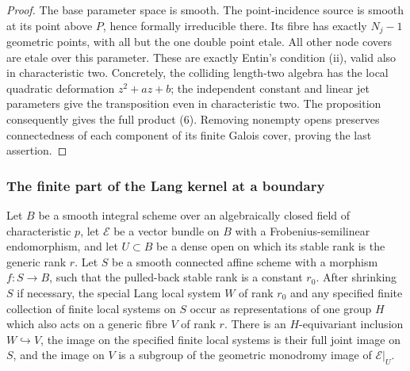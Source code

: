 \begin{proof}
The base parameter space is smooth.  The point-incidence
source is smooth at its point above $P$, hence formally
irreducible there.  Its fibre has exactly $N_j-1$ geometric
points, with all but the one double point etale.
All other node covers are etale over this parameter.
These are exactly Entin's condition (ii), valid also in
characteristic two.  Concretely, the colliding length-two
algebra has the local quadratic deformation
$z^2+az+b$; the independent constant and linear jet
parameters give the transposition even in characteristic
two.  The proposition consequently gives the full product
(6).  Removing nonempty opens preserves connectedness of
each component of its finite Galois cover, proving the
last assertion.
\end{proof}

\subsubsection{The finite part of the Lang kernel at a boundary}

\begin{lemma}\label{lem:boundary-Lang-finite-part}
Let $B$ be a smooth integral scheme over an algebraically
closed field of characteristic $p$, let $\mathcal E$ be a
vector bundle on $B$ with a Frobenius-semilinear endomorphism,
and let $U\subset B$ be a dense open on which its stable
rank is the generic rank $r$.
Let $S$ be a smooth connected affine scheme with a morphism
$f:S\to B$, such that the pulled-back stable rank is a
constant $r_0$.  After shrinking $S$ if necessary, the
special Lang local system $W$ of rank $r_0$ and any specified
finite collection of finite local systems on $S$ occur as
representations of one group $H$ which also acts on a
generic fibre $V$ of rank $r$.  There is an $H$-equivariant
inclusion $W\hookrightarrow V$, the image on the specified
finite local systems is their full joint image on $S$,
and the image on $V$ is a subgroup of the geometric
monodromy image of $\mathcal E|_U$.
\end{lemma}

